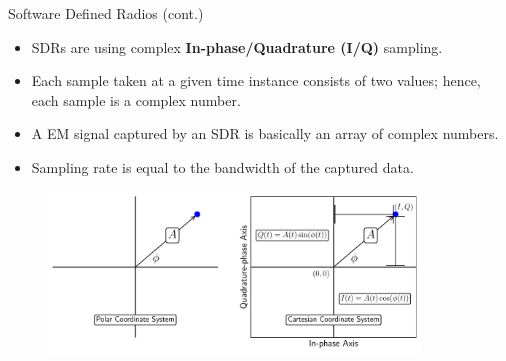 \documentclass[handout]{beamer}
\begin{document}
\begin{frame}{Software Defined Radios (cont.)}  

	\begin{itemize}
	\footnotesize
	\item SDRs are using complex \textbf{In-phase/Quadrature (I/Q)} sampling.
		\vspace{5pt}
	\item Each sample taken at a given time instance consists of two values; hence, each sample is a complex number.
		\vspace{5pt}
	\item A EM signal captured by an SDR is basically an array of complex numbers.
		\vspace{5pt}
	\item Sampling rate is equal to the bandwidth of the captured data.
	\end{itemize}

	\begin{figure}
		\includegraphics[width=280pt]{figures/iq-representation.pdf}
	\end{figure}

	\footnotesize

\end{frame}
\end{document}
